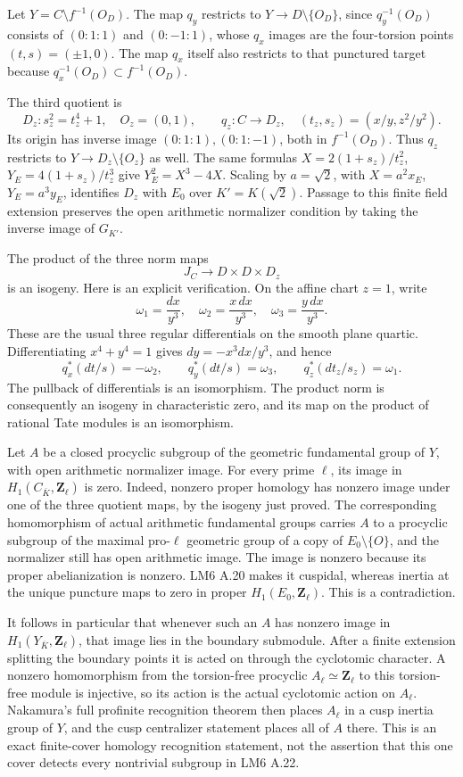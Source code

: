 Let $Y=C\setminus f^{-1}(O_D)$. The map $q_y$ restricts to $Y\to D\setminus\{O_D\}$, since $q_y^{-1}(O_D)$ consists of $(0:1:1)$ and $(0:-1:1)$, whose $q_x$ images are the four-torsion points $(t,s)=(\pm1,0)$. The map $q_x$ itself also restricts to that punctured target because $q_x^{-1}(O_D)\subset f^{-1}(O_D)$.

The third quotient is
\[
 D_z:s_z^2=t_z^4+1,\quad O_z=(0,1),\qquad
 q_z:C\to D_z,\quad(t_z,s_z)=(x/y,z^2/y^2).
\]
Its origin has inverse image $(0:1:1),(0:1:-1)$, both in $f^{-1}(O_D)$. Thus $q_z$ restricts to $Y\to D_z\setminus\{O_z\}$ as well. The same formulas $X=2(1+s_z)/t_z^2$, $Y_E=4(1+s_z)/t_z^3$ give $Y_E^2=X^3-4X$. Scaling by $a=\sqrt2$, with $X=a^2x_E$, $Y_E=a^3y_E$, identifies $D_z$ with $E_0$ over $K'=K(\sqrt2)$. Passage to this finite field extension preserves the open arithmetic normalizer condition by taking the inverse image of $G_{K'}$.

The product of the three norm maps
\[
 J_C\longrightarrow D\times D\times D_z
\]
is an isogeny. Here is an explicit verification. On the affine chart $z=1$, write
\[
 \omega_1=\frac{dx}{y^3},\quad
 \omega_2=\frac{x\,dx}{y^3},\quad
 \omega_3=\frac{y\,dx}{y^3}.
\]
These are the usual three regular differentials on the smooth plane quartic. Differentiating $x^4+y^4=1$ gives $dy=-x^3dx/y^3$, and hence
\[
 q_x^*(dt/s)=-\omega_2,\qquad
 q_y^*(dt/s)=\omega_3,\qquad
 q_z^*(dt_z/s_z)=\omega_1.
\]
The pullback of differentials is an isomorphism. The product norm is consequently an isogeny in characteristic zero, and its map on the product of rational Tate modules is an isomorphism.

Let $A$ be a closed procyclic subgroup of the geometric fundamental group of $Y$, with open arithmetic normalizer image. For every prime $\ell$, its image in $H_1(C_{\overline K},\mathbf Z_\ell)$ is zero. Indeed, nonzero proper homology has nonzero image under one of the three quotient maps, by the isogeny just proved. The corresponding homomorphism of actual arithmetic fundamental groups carries $A$ to a procyclic subgroup of the maximal pro-$\ell$ geometric group of a copy of $E_0\setminus\{O\}$, and the normalizer still has open arithmetic image. The image is nonzero because its proper abelianization is nonzero. LM6 A.20 makes it cuspidal, whereas inertia at the unique puncture maps to zero in proper $H_1(E_0,\mathbf Z_\ell)$. This is a contradiction.

It follows in particular that whenever such an $A$ has nonzero image in $H_1(Y_{\overline K},\mathbf Z_\ell)$, that image lies in the boundary submodule. After a finite extension splitting the boundary points it is acted on through the cyclotomic character. A nonzero homomorphism from the torsion-free procyclic $A_\ell\simeq\mathbf Z_\ell$ to this torsion-free module is injective, so its action is the actual cyclotomic action on $A_\ell$. Nakamura's full profinite recognition theorem then places $A_\ell$ in a cusp inertia group of $Y$, and the cusp centralizer statement places all of $A$ there. This is an exact finite-cover homology recognition statement, not the assertion that this one cover detects every nontrivial subgroup in LM6 A.22.

